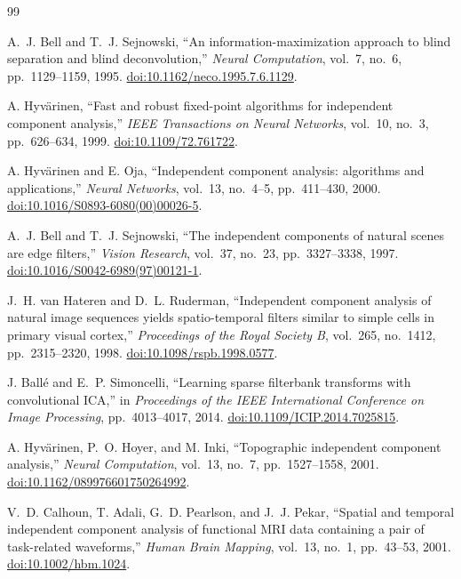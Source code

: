 \documentclass[11pt]{article}
\begin{document}
\begin{thebibliography}{99}

A.~J. Bell and T.~J. Sejnowski,
``An information-maximization approach to blind separation and blind
deconvolution,''
\emph{Neural Computation}, vol.~7, no.~6, pp.~1129--1159, 1995.
\href{https://doi.org/10.1162/neco.1995.7.6.1129}{doi:10.1162/neco.1995.7.6.1129}.

A. Hyv\"arinen,
``Fast and robust fixed-point algorithms for independent component analysis,''
\emph{IEEE Transactions on Neural Networks}, vol.~10, no.~3,
pp.~626--634, 1999.
\href{https://doi.org/10.1109/72.761722}{doi:10.1109/72.761722}.

A. Hyv\"arinen and E. Oja,
``Independent component analysis: algorithms and applications,''
\emph{Neural Networks}, vol.~13, no.~4--5, pp.~411--430, 2000.
\href{https://doi.org/10.1016/S0893-6080(00)00026-5}{doi:10.1016/S0893-6080(00)00026-5}.

A.~J. Bell and T.~J. Sejnowski,
``The independent components of natural scenes are edge filters,''
\emph{Vision Research}, vol.~37, no.~23, pp.~3327--3338, 1997.
\href{https://doi.org/10.1016/S0042-6989(97)00121-1}{doi:10.1016/S0042-6989(97)00121-1}.

J.~H. van Hateren and D.~L. Ruderman,
``Independent component analysis of natural image sequences yields
spatio-temporal filters similar to simple cells in primary visual cortex,''
\emph{Proceedings of the Royal Society B}, vol.~265, no.~1412,
pp.~2315--2320, 1998.
\href{https://doi.org/10.1098/rspb.1998.0577}{doi:10.1098/rspb.1998.0577}.

J. Ball\'e and E.~P. Simoncelli,
``Learning sparse filterbank transforms with convolutional ICA,''
in \emph{Proceedings of the IEEE International Conference on Image Processing},
pp.~4013--4017, 2014.
\href{https://doi.org/10.1109/ICIP.2014.7025815}{doi:10.1109/ICIP.2014.7025815}.

A. Hyv\"arinen, P.~O. Hoyer, and M. Inki,
``Topographic independent component analysis,''
\emph{Neural Computation}, vol.~13, no.~7, pp.~1527--1558, 2001.
\href{https://doi.org/10.1162/089976601750264992}{doi:10.1162/089976601750264992}.

V.~D. Calhoun, T. Adali, G.~D. Pearlson, and J.~J. Pekar,
``Spatial and temporal independent component analysis of functional MRI data
containing a pair of task-related waveforms,''
\emph{Human Brain Mapping}, vol.~13, no.~1, pp.~43--53, 2001.
\href{https://doi.org/10.1002/hbm.1024}{doi:10.1002/hbm.1024}.


\end{thebibliography}
\end{document}
